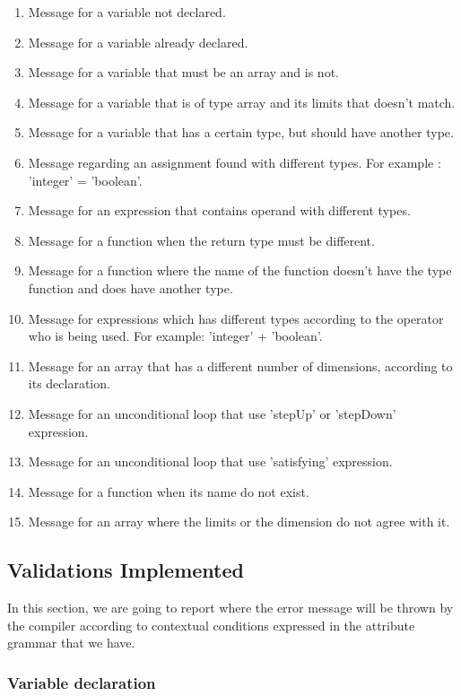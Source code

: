 \documentclass[
  oneside,
  11pt, a4paper,
  footinclude=true,
  headinclude=true,
  cleardoublepage=empty
]{scrbook}
\begin{document}
\begin{enumerate}
\item Message for a variable not declared.
\item Message for a variable already declared.
\item Message for a variable that must be an array and is not.
\item Message for a variable that is of type array and its limits that doesn't match.
\item Message for a variable that has a certain type, but should have another type. 
\item Message regarding an assignment found with different types. For example : 'integer' = 'boolean'. 
\item Message for an expression that contains operand with different types.
\item Message for a function when the return type must be different.
\item Message for a function where the name of the function doesn't have the type function and does have another type.
\item Message for expressions which has different types according to the operator who is being used. For example: 'integer' + 'boolean'. 
\item Message for an array that has a different number of dimensions, according to its declaration.
\item Message for an unconditional loop that use 'stepUp' or 'stepDown' expression.
\item Message for an unconditional loop that use 'satisfying' expression.
\item Message for a function when its name do not exist.
\item Message for an array where the limits or the dimension do not agree with it.
\end{enumerate}


\subsection{Validations Implemented}

In this section, we are going to report where the error message will be thrown by the compiler according to contextual conditions expressed in the attribute grammar that we have.

\subsubsection{Variable declaration}
\end{document}
